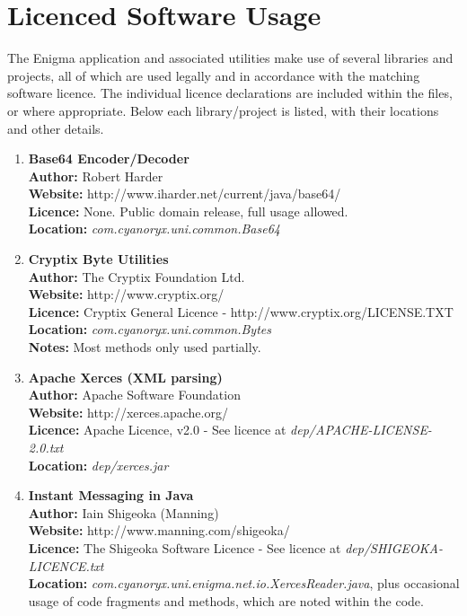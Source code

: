 
\chapter{Licenced Software Usage}
\label{AppendixC}

The Enigma application and associated utilities make use of several libraries and projects, all of which are used legally and in accordance with the matching software licence. The individual licence declarations are included within the files, or where appropriate. Below each library/project is listed, with their locations and other details.

\begin{enumerate}
	\item \textbf{Base64 Encoder/Decoder} \\
		\textbf{Author:} Robert Harder \\
		\textbf{Website:} http://www.iharder.net/current/java/base64/ \\
		\textbf{Licence:} None. Public domain release, full usage allowed. \\
		\textbf{Location:} \emph{com.cyanoryx.uni.common.Base64}
		
	\item \textbf{Cryptix Byte Utilities} \\
		\textbf{Author:} The Cryptix Foundation Ltd. \\
		\textbf{Website:} http://www.cryptix.org/ \\
		\textbf{Licence:} Cryptix General Licence -  http://www.cryptix.org/LICENSE.TXT \\
		\textbf{Location:} \emph{com.cyanoryx.uni.common.Bytes} \\
		\textbf{Notes:} Most methods only used partially.
		
	\item \textbf{Apache Xerces (XML parsing)} \\
		\textbf{Author:} Apache Software Foundation \\
		\textbf{Website:} http://xerces.apache.org/ \\
		\textbf{Licence:} Apache Licence, v2.0 - See licence at \emph{dep/APACHE-LICENSE-2.0.txt} \\
		\textbf{Location:} \emph{dep/xerces.jar}
		
	\item \textbf{Instant Messaging in Java} \\
		\textbf{Author:}  Iain Shigeoka (Manning) \\
		\textbf{Website:} http://www.manning.com/shigeoka/ \\
		\textbf{Licence:} The Shigeoka Software Licence - See licence at \emph{dep/SHIGEOKA-LICENCE.txt} \\
		\textbf{Location:} \emph{com.cyanoryx.uni.enigma.net.io.XercesReader.java}, plus occasional usage of code fragments and methods, which are noted within the code.
\end{enumerate}